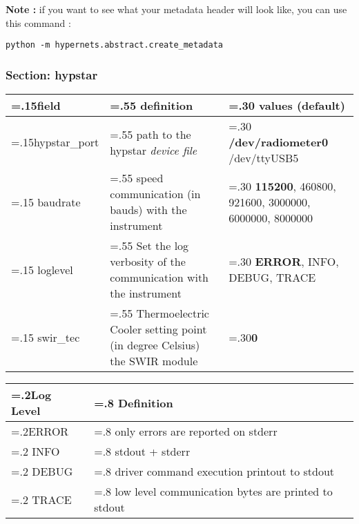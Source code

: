 \noindent\textbf{Note :} if you want to see what your metadata header will look like,
you can use this command :
\vspace{-10pt}
\begin{lstlisting}
python -m hypernets.abstract.create_metadata
\end{lstlisting}

\subsubsection{Section: hypstar}

\begin{table}[H]
	\centering
	\begin{tabularx}{\textwidth} {
			| >{\hsize=.15\hsize}X
			| >{\hsize=.55\hsize}X
			| >{\hsize=.30\hsize}X | }
		\hline
		\textbf{field} & \textbf{definition} & values (\textbf{default}) \\
		\hline
		\hline
		hypstar\_port & path to the hypstar \textit{device file} 
		& \textbf{/dev/radiometer0} \newline
		/dev/ttyUSB5 
		\\ \hline
		baudrate & speed communication (in bauds) with the instrument 
		& \textbf{115200}, 460800, 921600, 3000000, 6000000, 8000000
		\\ \hline
		loglevel & Set the log verbosity of the communication with the instrument 
		& \textbf{ERROR}, INFO, DEBUG, TRACE 
		\\ \hline
		swir\_tec & Thermoelectric Cooler setting point (in degree Celsius) 
		the SWIR module
		& [ -15 ; +40 ] \textbf{0}
		\\ \hline
	\end{tabularx}
\end{table}


\begin{table}[H]
	\centering
	\begin{tabularx}{\textwidth} {
			| >{\hsize=.2\hsize}X
			| >{\hsize=.8\hsize}X|}
		\hline
		\textbf{Log Level} & \textbf{Definition}  \\
		\hline
		\hline
		ERROR & only errors are reported on stderr \\ \hline
		INFO & stdout + stderr \\ \hline
		DEBUG & driver command execution printout to stdout \\ \hline
		TRACE & low level communication bytes are printed to stdout \\
		\hline
	\end{tabularx}
\end{table}

